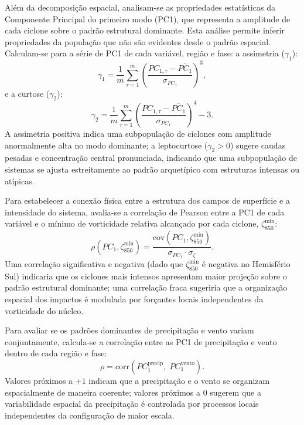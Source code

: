 Além da decomposição espacial, analisam-se as propriedades estatísticas da Componente Principal do primeiro modo (PC1), que representa a amplitude de cada ciclone sobre o padrão estrutural dominante. Esta análise permite inferir propriedades da população que não são evidentes desde o padrão espacial. Calculam-se para a série de PC1 de cada variável, região e fase: a assimetria ($\gamma_1$):
\begin{equation}
    \gamma_1 = \frac{1}{m} \sum_{\tau=1}^{m} \left(\frac{PC_{1,\tau} - \overline{PC_1}}{\sigma_{PC_1}}\right)^3,
\end{equation}
e a curtose ($\gamma_2$):
\begin{equation}
    \gamma_2 = \frac{1}{m} \sum_{\tau=1}^{m} \left(\frac{PC_{1,\tau} - \overline{PC_1}}{\sigma_{PC_1}}\right)^4 - 3.
\end{equation}
A assimetria positiva indica uma subpopulação de ciclones com amplitude anormalmente alta no modo dominante; a leptocurtose ($\gamma_2 > 0$) sugere caudas pesadas e concentração central pronunciada, indicando que uma subpopulação de sistemas se ajusta estreitamente ao padrão arquetípico com estruturas intensas ou atípicas.

Para estabelecer a conexão física entre a estrutura dos campos de superfície e a intensidade do sistema, avalia-se a correlação de Pearson entre a PC1 de cada variável e o mínimo de vorticidade relativa alcançado por cada ciclone, $\zeta_{850}^{\min}$:
\begin{equation}
    \rho\!\left(PC_1, \zeta_{850}^{\min}\right) = \frac{\text{cov}\!\left(PC_1, \zeta_{850}^{\min}\right)}{\sigma_{PC_1} \cdot \sigma_{\zeta}}.
\end{equation}
Uma correlação significativa e negativa (dado que $\zeta_{850}^{\min}$ é negativa no Hemisfério Sul) indicaria que os ciclones mais intensos apresentam maior projeção sobre o padrão estrutural dominante; uma correlação fraca sugeriria que a organização espacial dos impactos é modulada por forçantes locais independentes da vorticidade do núcleo.

Para avaliar se os padrões dominantes de precipitação e vento variam conjuntamente, calcula-se a correlação entre as PC1 de precipitação e vento dentro de cada região e fase:
\begin{equation}
    \rho = \text{corr}\!\left(PC_1^{\text{precip}},\; PC_1^{\text{vento}}\right).
\end{equation}
Valores próximos a $+1$ indicam que a precipitação e o vento se organizam espacialmente de maneira coerente; valores próximos a $0$ sugerem que a variabilidade espacial da precipitação é controlada por processos locais independentes da configuração de maior escala.

